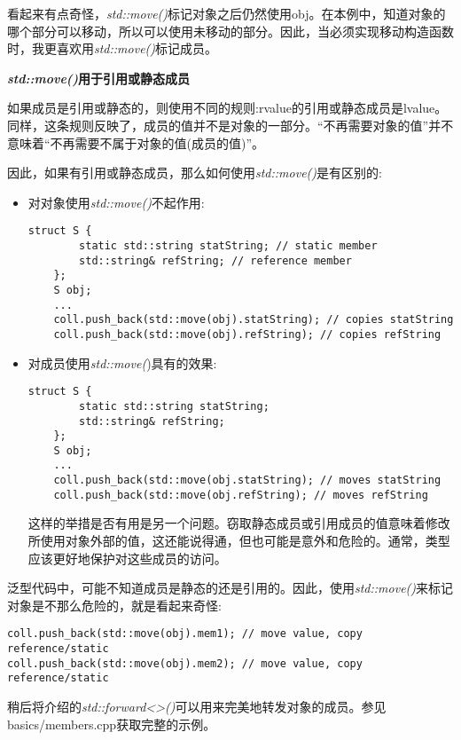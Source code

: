 看起来有点奇怪，\textit{std::move()}标记对象之后仍然使用obj。在本例中，知道对象的哪个部分可以移动，所以可以使用未移动的部分。因此，当必须实现移动构造函数时，我更喜欢用\textit{std::move()}标记成员。\par

\hspace*{\fill} \par %
\textbf{\textit{std::move()}用于引用或静态成员}

如果成员是引用或静态的，则使用不同的规则:rvalue的引用或静态成员是lvalue。同样，这条规则反映了，成员的值并不是对象的一部分。“不再需要对象的值”并不意味着“不再需要不属于对象的值(成员的值)”。\par

因此，如果有引用或静态成员，那么如何使用\textit{std::move()}是有区别的:\par

\begin{itemize}
	\item 对对象使用\textit{std::move()}不起作用:\par
	\begin{lstlisting}[caption={}]
	struct S {
		static std::string statString; // static member
		std::string& refString; // reference member
	};
	S obj;
	...
	coll.push_back(std::move(obj).statString); // copies statString
	coll.push_back(std::move(obj).refString); // copies refString
	\end{lstlisting}
	\item 对成员使用\textit{std::move(})具有的效果:\par
	\begin{lstlisting}[caption={}]
	struct S {
		static std::string statString;
		std::string& refString;
	};
	S obj;
	...
	coll.push_back(std::move(obj.statString); // moves statString
	coll.push_back(std::move(obj.refString); // moves refString
	\end{lstlisting}
	这样的举措是否有用是另一个问题。窃取静态成员或引用成员的值意味着修改所使用对象外部的值，这还能说得通，但也可能是意外和危险的。通常，类型应该更好地保护对这些成员的访问。\par
\end{itemize}

泛型代码中，可能不知道成员是静态的还是引用的。因此，使用\textit{std::move()}来标记对象是不那么危险的，就是看起来奇怪:\par

\begin{lstlisting}[caption={}]
coll.push_back(std::move(obj).mem1); // move value, copy reference/static
coll.push_back(std::move(obj).mem2); // move value, copy reference/static
\end{lstlisting}

稍后将介绍的\textit{std::forward<>()}可以用来完美地转发对象的成员。参见basics/members.cpp获取完整的示例。\par

























